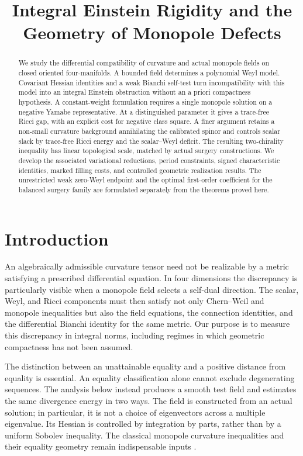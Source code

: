 \documentclass[10pt,a4paper]{article}
\title{Integral Einstein Rigidity and the Geometry of Monopole Defects}
\author{}
\date{}
\theoremstyle{definition}
\theoremstyle{remark}
\numberwithin{equation}{section}
\begin{document}
\maketitle
\begin{abstract}
We study the differential compatibility of curvature and actual monopole
fields on closed oriented four-manifolds. A bounded field determines a
polynomial Weyl model. Covariant Hessian identities and a weak Bianchi
self-test turn incompatibility with this model into an integral Einstein
obstruction without an a priori compactness hypothesis. A constant-weight
formulation requires a single monopole solution on a negative Yamabe
representative. At a distinguished parameter it gives a trace-free Ricci
gap, with an explicit cost for negative class square. A finer argument
retains a non-small curvature background annihilating the calibrated
spinor and controls scalar slack by trace-free Ricci energy and the
scalar--Weyl deficit. The resulting two-chirality inequality has linear
topological scale, matched by actual surgery constructions. We develop
the associated variational reductions, period constraints, signed
characteristic identities, marked filling costs, and controlled geometric
realization results. The unrestricted weak zero-Weyl endpoint and the
optimal first-order coefficient for the balanced surgery family are
formulated separately from the theorems proved here.
\end{abstract}
\tableofcontents
\clearpage
\section{Introduction}
\label{sec:introduction}

An algebraically admissible curvature tensor need not be realizable by a
metric satisfying a prescribed differential equation. In four dimensions
the discrepancy is particularly visible when a monopole field selects a
self-dual direction. The scalar, Weyl, and Ricci components must then
satisfy not only Chern--Weil and monopole inequalities but also the field
equations, the connection identities, and the differential Bianchi
identity for the same metric. Our purpose is to measure this discrepancy
in integral norms, including regimes in which geometric compactness has
not been assumed.

The distinction between an unattainable equality and a positive distance
from equality is essential. An equality classification alone cannot
exclude degenerating sequences. The analysis below instead produces a
smooth test field and estimates the same divergence energy in two ways.
The field is constructed from an actual solution; in particular, it is
not a choice of eigenvectors across a multiple eigenvalue. Its Hessian
is controlled by integration by parts, rather than by a uniform Sobolev
inequality. The classical monopole curvature inequalities and their
equality geometry remain indispensable inputs
\cite{LeBrun2001,Kotschick2004,IshidaLeBrun2003,IMN2016}.
\end{document}
